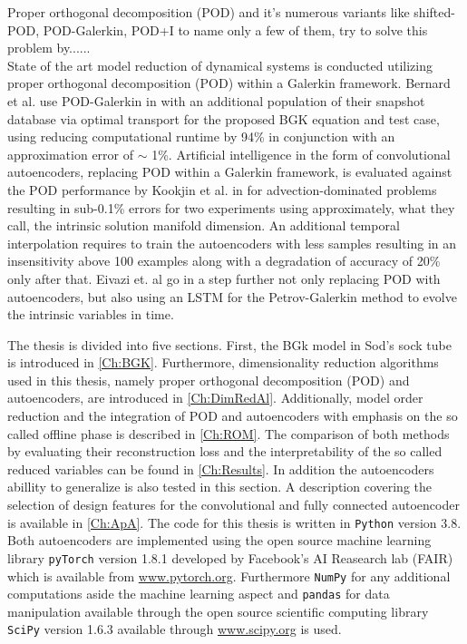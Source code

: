 Proper orthogonal decomposition (POD) and it's numerous variants like shifted-POD\cite{bibid}, POD-Galerkin\cite{bibid}, POD+I \cite{bibid} to name only a few of them, try to solve this problem by......	\\
State of the art model reduction of dynamical systems is conducted utilizing proper orthogonal decomposition (POD) within a Galerkin framework. Bernard et al. use POD-Galerkin  in \cite{Bernard} with an additional population of their snapshot database via optimal transport for the proposed BGK equation and test case, using reducing computational runtime by 94\% in conjunction with an approximation error of \(\sim\) 1\%. Artificial intelligence in the form of convolutional autoencoders, replacing POD within a Galerkin framework, is evaluated against the POD performance by Kookjin et al. in \cite{Carlberg} for advection-dominated problems resulting in sub-0.1\% errors for two experiments using approximately, what they call, the intrinsic solution manifold dimension. An additional temporal interpolation requires to train the autoencoders with less samples resulting in an insensitivity above 100 examples along with a degradation of accuracy of 20\% only after that. Eivazi et. al go in \cite{eivazi2021recurrent} a step further not only replacing POD with autoencoders, but also using an LSTM for the Petrov-Galerkin method to evolve the intrinsic variables in time. 

The thesis is divided into five sections. First, the BGk model in Sod's sock tube is introduced in \cref{Ch:BGK}. Furthermore, dimensionality reduction algorithms used in this thesis, namely proper orthogonal decomposition (POD) and autoencoders, are introduced in \cref{Ch:DimRedAl}. Additionally, model order reduction and the integration of POD and autoencoders with emphasis on the so called offline phase is described in \cref{Ch:ROM}. The comparison of both methods by evaluating their reconstruction loss and the interpretability of the so called reduced variables can be found in \cref{Ch:Results}. In addition the autoencoders abillity to generalize is also tested in this section. A description covering the selection of design features for the convolutional and fully connected autoencoder is available in \cref{Ch:ApA}. The code for this thesis is written in \texttt{Python} version 3.8. Both autoencoders are implemented using the open source machine learning library \texttt{pyTorch} version 1.8.1 developed by Facebook's AI Reasearch lab (FAIR) which is available from \url{www.pytorch.org}. Furthermore \texttt{NumPy} for any additional computations aside the machine learning aspect and \texttt{pandas} for data manipulation available through the open source scientific computing library \texttt{SciPy} version 1.6.3 available through \url{www.scipy.org} is used.\\  
